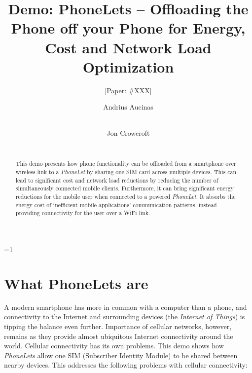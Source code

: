 \documentclass{sig-alternate-2013}
\def\anon{0}        %
\begin{document}
\date{}


\title{Demo: PhoneLets -- Offloading the Phone off your Phone for Energy, Cost and Network Load Optimization}
\ifnum\anon=1
\author{[Paper: \#XXX]}%
\else
{}
\author{
\alignauthor Andrius Aucinas\\
\\
\and
\alignauthor Jon Crowcroft\\
\\
}
\fi

    
\maketitle
\begin{abstract}
This demo presents how phone functionality can be offloaded from a smartphone over wireless link to a \emph{PhoneLet} by sharing one SIM card across multiple devices. This can lead to significant cost and network load reductions by reducing the number of simultaneously connected mobile clients. Furthermore, it can bring significant energy reductions for the mobile user when connected to a powered \emph{PhoneLet}. It absorbs the energy cost of inefficient mobile applications' communication patterns, instead providing connectivity for the user over a WiFi link.
\end{abstract} 



\section{What PhoneLets are}
\label{section:intro}

A modern smartphone has more in common with a computer than a phone, and connectivity to the Internet and surrounding devices (the \emph{Internet of Things}) is tipping the balance even further. Importance of cellular networks, however, remains as they provide almost ubiquitous Internet connectivity around the world. Cellular connectivity has its own problems. This demo shows how \emph{PhoneLets} allow one SIM (Subscriber Identity Module) to be shared between nearby devices. This addresses the following problems with cellular connectivity:
\end{document}
